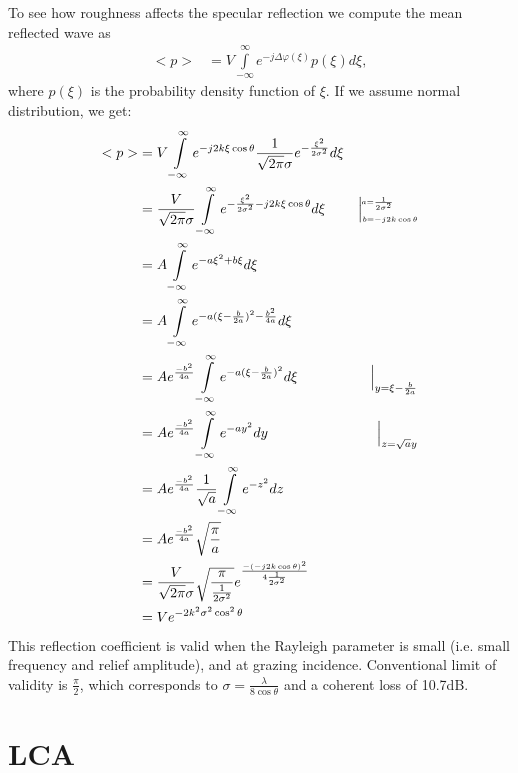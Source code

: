 \begin{figure}[th]
\end{figure}

To see how roughness affects the specular reflection we compute the mean reflected wave as
\begin{align}
<p> &= V\int\limits_{-\infty}^{\infty} e^{-j\Delta\varphi(\xi)} p(\xi) d\xi,
\end{align}
where $p(\xi)$ is the probability density function of $\xi$. If we assume normal distribution, we get:
\begin{align}
<p> &= V\int\limits_{-\infty}^{\infty} e^{-j2k\xi\cos\theta} \frac{1}{\sqrt{2\pi}\sigma}e^{-\frac{\xi^2}{2\sigma^2}} d\xi \nn
&= \frac{V}{\sqrt{2\pi}\sigma} \int\limits_{-\infty}^{\infty} e^{-\frac{\xi^2}{2\sigma^2}-j2k\xi\cos\theta} d\xi &\Big|{\begin{matrix}\scriptscriptstyle\hspace{-0.64cm} a = \frac{1}{2\sigma^2}\\
\scriptscriptstyle b = -j2k\cos\theta\end{matrix}}\nn
&= A \int\limits_{-\infty}^{\infty} e^{-a\xi^2 + b\xi} d\xi \nn
&= A \int\limits_{-\infty}^{\infty} e^{-a(\xi - \frac{b}{2a})^2 - \frac{b^2}{4a}} d\xi \nn
&= A e^{\frac{-b^2}{4a}} \int\limits_{-\infty}^{\infty} e^{-a(\xi - \frac{b}{2a})^2} d\xi & \Big|_{y = \xi - \frac{b}{2a}}\nn
&= A e^{\frac{-b^2}{4a}} \int\limits_{-\infty}^{\infty} e^{-ay^2} dy & \Big|_{z = \sqrt{a} y}\nn
&= A e^{\frac{-b^2}{4a}}\frac{1}{\sqrt{a}} \int\limits_{-\infty}^{\infty} e^{-z^2} dz \nn
&= A e^{\frac{-b^2}{4a}}\sqrt{\frac{\pi}{a}} \nn
&= \frac{V}{\sqrt{2\pi}\sigma} \sqrt{\frac{\pi}{\frac{1}{2\sigma^2}}} e^{\frac{-(-j2k\cos\theta)^2}{4\frac{1}{2\sigma^2}}} \nn
&= V e^{-2k^2\sigma^2\cos^2\theta}
\end{align}
This reflection coefficient is valid when the Rayleigh parameter is small (i.e. small frequency and relief amplitude), and at grazing incidence. Conventional limit of validity is $\frac{\pi}{2}$, which corresponds to $\sigma = \frac{\lambda}{8\cos\theta}$ and a coherent loss of 10.7dB.



\section{LCA}

